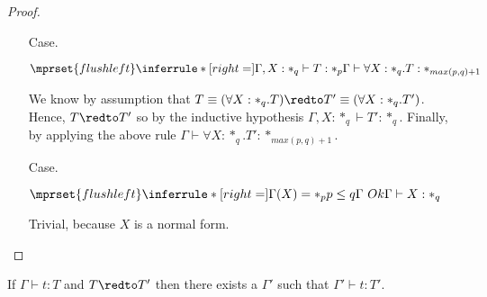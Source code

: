 \begin{proof}
\begin{itemize}
\item[Case.]\ \\
  \begin{center}
    \begin{math}
      $$\mprset{flushleft}
      \inferrule* [right=] {
        \Gamma,X : *_q \vdash T : *_p
      }{\Gamma \vdash \forall X:*_q.T : *_{max(p,q)+1}}
    \end{math}
  \end{center}
  We know by assumption that $T \equiv (\forall X:*_q.T) \redto T' \equiv (\forall X:*_q.T')$.  Hence,
  $T \redto T'$ so by the inductive hypothesis $\Gamma,X:*_q \vdash T' : *_q$.  Finally, by applying the
  above rule $\Gamma \vdash \forall X:*_q.T':*_{max(p,q)+1}$.

\item[Case.]\ \\
  \begin{center}
    \begin{math}
      $$\mprset{flushleft}
      \inferrule* [right=] {
        \Gamma(X) = *_p
        \\
        p \leq q
        \\
        \Gamma\ Ok
      }{\Gamma \vdash X : *_q}
    \end{math} 
  \end{center}
  Trivial, because $X$ is a normal form.
\end{itemize}
\end{proof}
\begin{lemma}
  \label{lemma:preservation_2}
  If $\Gamma \vdash t:T$ and $T \redto T'$ then there exists a $\Gamma'$ such that $\Gamma' \vdash t:T'$.
\end{lemma}
